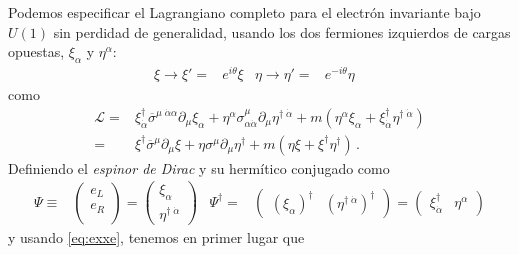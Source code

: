 Podemos especificar el Lagrangiano completo para el electrón invariante bajo $U(1)$ sin perdidad de generalidad, usando los dos fermiones izquierdos de cargas opuestas, $\xi_{\alpha}$ y $\eta^{\alpha}$:
\begin{align}
  \xi\to\xi'=&e^{i\theta}\xi &   \eta\to\eta'=&e^{-i\theta}\eta &
\end{align}
como
\begin{align}
  \mathcal{L}=&\xi^{\dagger}_{\dot{\alpha}}\overline{\sigma}^{\mu\;\dot{\alpha}\alpha}\partial_{\mu}\xi_{\alpha}+\eta^{\alpha}\sigma^{\mu}_{\alpha\dot{\alpha}}\partial_{\mu}\eta^{\dagger\;\dot{\alpha}}
+m \left(\eta^{\alpha} \xi_{\alpha}+\xi^{\dagger}_{\dot{\alpha}} \eta^{\dagger\;\dot{\alpha}}\right)\nonumber\\
=&\xi^{\dagger}\overline{\sigma}^{\mu}\partial_{\mu}\xi+\eta\sigma^{\mu}\partial_{\mu}\eta^{\dagger}
+m \left(\eta\xi+\xi^{\dagger}\eta^{\dagger} \right)\,.
\end{align}
Definiendo el \emph{espinor de Dirac}  y su hermítico conjugado como
\begin{align}
\label{eq:psid}
  \Psi\equiv&  \begin{pmatrix}
   e_L\\
   e_R\\    
  \end{pmatrix}=
  \begin{pmatrix}
   \xi_{\alpha}\\
   \eta^{\dagger\;\dot{\alpha}}    
  \end{pmatrix}&  \Psi^{\dagger}=&
  \begin{pmatrix}
   \left( \xi_{\alpha} \right)^{\dagger} & \left( \eta^{\dagger\;\dot{\alpha}} \right)^{\dagger}    
  \end{pmatrix}=  \begin{pmatrix}
  \xi^{\dagger}_{\dot{\alpha}}& \eta^{\alpha}
  \end{pmatrix}
\end{align}
y usando \eqref{eq:exxe}, tenemos en primer lugar que
